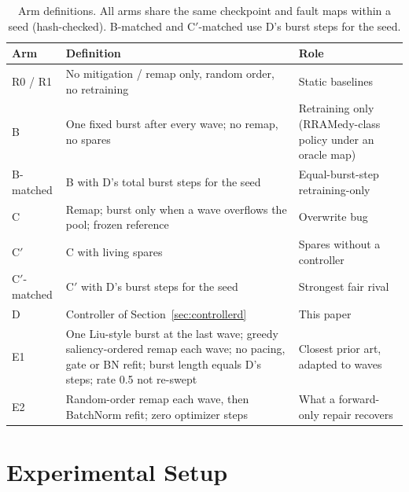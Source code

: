 \documentclass[journal]{IEEEtran}
\begin{document}
\begin{table}[t]
\centering
\caption{Arm definitions. All arms share the same checkpoint and fault maps within a seed (hash-checked). B-matched and C$'$-matched use D's burst steps for the seed.}
\label{tab:arms}
\small
\begin{tabular}{p{2.1cm}p{9.2cm}p{4.2cm}}
\toprule
Arm & Definition & Role \\
\midrule
R0 / R1 & No mitigation / remap only, random order, no retraining & Static baselines \\
B & One fixed burst after every wave; no remap, no spares & Retraining only (RRAMedy-class policy under an oracle map) \\
B-matched & B with D's total burst steps for the seed & Equal-burst-step retraining-only \\
C & Remap; burst only when a wave overflows the pool; frozen reference & Overwrite bug \\
C$'$ & C with living spares & Spares without a controller \\
C$'$-matched & C$'$ with D's burst steps for the seed & Strongest fair rival \\
D & Controller of Section~\ref{sec:controllerd} & This paper \\
E1 & One Liu-style burst at the last wave; greedy saliency-ordered remap each wave; no pacing, gate or BN refit; burst length equals D's steps; rate 0.5 not re-swept & Closest prior art, adapted to waves \\
E2 & Random-order remap each wave, then BatchNorm refit; zero optimizer steps & What a forward-only repair recovers \\
\bottomrule
\end{tabular}
\end{table}

\section{Experimental Setup}
\label{sec:methodology}
\end{document}
